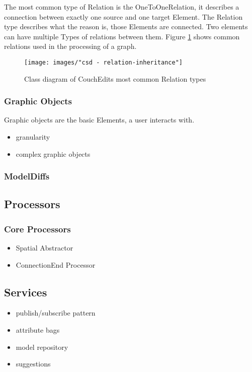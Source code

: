 The most common type of Relation is the OneToOneRelation, it describes a connection between exactly one source and one target Element. The Relation type describes what the reason is, those Elements are connected. Two elements can have multiple Types of relations between them. Figure \ref{fig:relations_inheritance} shows common relations used in the processing of a graph.

\begin{figure}
  \centering
  \texttt{[image: images/"csd - relation-inheritance"]}
  \caption{Class diagram of CouchEdits most common Relation types}
  \label{fig:relations_inheritance}
\end{figure}


\subsubsection{Graphic Objects}
Graphic objects are the basic Elements, a user interacts with.

\begin{itemize}
  \item granularity
  \item complex graphic objects
\end{itemize}

\subsubsection{ModelDiffs}


\subsection{Processors}

\subsubsection{Core Processors}
\begin{itemize}
  \item Spatial Abstractor 
  \item ConnectionEnd Processor
\end{itemize}

\subsection{Services}



\begin{itemize}
  \item publish/subscribe pattern
  \item attribute bags
  \item model repository
  \item suggestions
\end{itemize}

